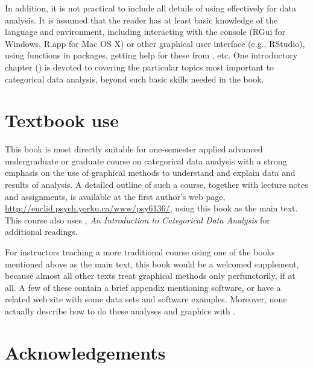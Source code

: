 In addition, it is not practical to include all details of using \R effectively for
data analysis. It is assumed that the reader has at least basic knowledge of the \R language and
environment, including interacting with the \R console (RGui for Windows, R.app for Mac OS X)
or other graphical user interface (e.g., RStudio), using \R functions in packages,
getting help for these from \R, etc.  One introductory chapter () is devoted
to covering the particular topics most important to categorical data analysis,
beyond such basic skills needed in the book.

\section*{Textbook use}
This book is most directly suitable for one-semester applied 
advanced undergraduate or graduate
course on categorical data analysis with a strong emphasis
on the use of graphical methods to understand and explain data and
results of analysis.
A detailed outline of such a course, together with lecture notes
and assignments,
is available at the first author's
web page, \url{http://euclid.psych.yorku.ca/www/psy6136/}, using this
book as the main text.  This course also uses 
\citet{Agresti:2007:ICDA}, \emph{An Introduction to Categorical Data Analysis}
for additional readings.

For instructors teaching a more traditional course using one of the books
mentioned above as the main text, this book would be a welcomed supplement,
because almost all other texts treat graphical methods only perfunctorily,
if at all.
A few of these contain a brief appendix mentioning software, or have
a related web site with some data sets and software examples.
Moreover, none actually describe how to do these analyses and graphics with \R.


\section*{Acknowledgements}

